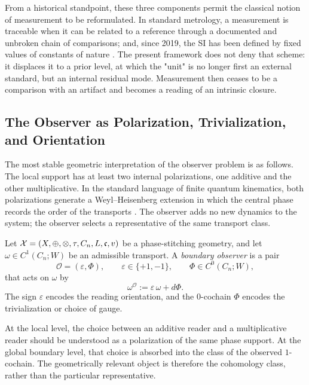 From a historical standpoint, these three components permit the classical notion of
measurement to be reformulated. In standard metrology, a measurement is traceable when it can be related to a reference
through a documented and unbroken chain of comparisons; and, since 2019, the SI has been defined
by fixed values of constants of nature \cite{NISTTraceability2023,BIPMSI2019}.
The present framework does not deny that scheme: it displaces it to a prior level, at which the
"unit" is no longer first an external standard, but an internal residual mode. Measurement then ceases to
be a comparison with an artifact and becomes a reading of an intrinsic closure.

\subsection{The Observer as Polarization, Trivialization, and Orientation}

The most stable geometric interpretation of the observer problem is as follows. The local support has at least two internal polarizations, one additive and the other multiplicative. In the standard language of finite quantum kinematics, both polarizations generate a Weyl--Heisenberg extension in which the central phase records the order of the transports \cite{Tolar2014,Vourdas2006}. The observer adds no new dynamics to the system; the observer selects a representative of the same transport class.

\begin{definition}
Let $\mathcal X=(X,\oplus,\otimes,\tau,C_n,L,\mathfrak c,v)$ be a phase-stitching geometry, and let
$\omega\in C^1(C_n;W)$ be an admissible transport. A \emph{boundary observer} is a pair
\[
\mathcal O=(\varepsilon,\Phi),
\qquad
\varepsilon\in\{+1,-1\},
\qquad
\Phi\in C^0(C_n;W),
\]
that acts on $\omega$ by
\[
\omega^{\mathcal O}:=\varepsilon\,\omega+d\Phi.
\]
The sign $\varepsilon$ encodes the reading orientation, and the $0$-cochain $\Phi$ encodes the
trivialization or choice of gauge.
\end{definition}

\begin{remark}
At the local level, the choice between an additive reader and a multiplicative reader should be understood as a polarization of the same phase support. At the global boundary level, that choice is absorbed into the class of the observed $1$-cochain. The geometrically relevant object is therefore the cohomology class, rather than the particular representative.
\end{remark}

